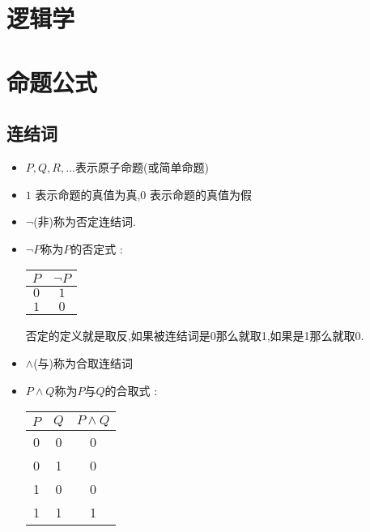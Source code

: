 \chapter{逻辑学}{

\chapter{命题公式}{

  \section{连结词}{

    \begin{itemize}
      \item $P,Q,R,...$表示原子命题(或简单命题)
      \item $1$ 表示命题的真值为真,$0$ 表示命题的真值为假
      \item $\lnot$(非)称为否定连结词.
      \item {
            $\lnot P$称为$P$的否定式 :

            \begin{center}
              \begin{tabular}{c|c}
                \hline
                $P$ & $\lnot P$ \\
                \hline
                $0$ & $1$       \\
                $1$ & $0$       \\
                \hline
              \end{tabular}
            \end{center}

            否定的定义就是取反,如果被连结词是0那么就取1,如果是1那么就取0.
            }
      \item $\land$(与)称为合取连结词
      \item {
            $P \land Q$称为$P$与$Q$的合取式 :

            \begin{center}
              \begin{tabular}{c|c|c}
                \hline
                $P$ & $Q$ & $P \land Q$ \\
                \hline
                0   & 0   & 0           \\
                0   & 1   & 0           \\
                1   & 0   & 0           \\
                1   & 1   & 1           \\
                \hline
              \end{tabular}
            \end{center}

}
\end{itemize}}}}
